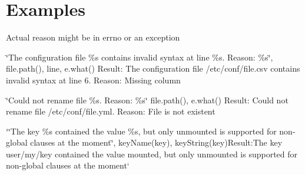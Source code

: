 \section*{Examples}

Actual reason might be in errno or an exception


\begin{DoxyItemize}
\item {\ttfamily \char`\"{}\+The configuration file \%s contains invalid syntax at line \%s. Reason\+: \%s\char`\"{}, file.\+path(), line, e.\+what()} Result\+: {\ttfamily The configuration file /etc/conf/file.csv contains invalid syntax at line 6. Reason\+: Missing column}
\item {\ttfamily \char`\"{}\+Could not rename file \%s. Reason\+: \%s\char`\"{} file.\+path(), e.\+what()} Result\+: {\ttfamily Could not rename file /etc/conf/file.yml. Reason\+: File is not existent}
\item `\char`\"{}\+The key \%s contained the value \textquotesingle{}\%s\textquotesingle{}, but only \textquotesingle{}unmounted\textquotesingle{} is supported for non-\/global clauses at the moment\char`\"{}, key\+Name(key), key\+String(key){\ttfamily  Result\+:}The key user/my/key contained the value \textquotesingle{}mounted\textquotesingle{}, but only \textquotesingle{}unmounted\textquotesingle{} is supported for non-\/global clauses at the moment` 
\end{DoxyItemize}